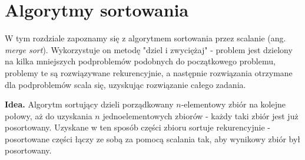 \section{Algorytmy sortowania}

W tym rozdziale zapoznamy się z algorytmem sortowania przez scalanie (ang. \textit{merge sort}). 
Wykorzystuje on metodę "dziel i zwyciężaj" - problem jest dzielony na kilka mniejszych podproblemów podobnych do początkowego problemu, problemy te są rozwiązywane rekurencyjnie, a następnie rozwiązania otrzymane dla podproblemów scala się, uzyskując rozwiązanie całego zadania.

\textbf{Idea.} Algorytm sortujący dzieli porządkowany $n$-elementowy zbiór na kolejne połowy, aż do uzyskania $n$ jednoelementowych zbiorów - każdy taki zbiór jest już posortowany. 
Uzyskane w ten sposób części zbioru sortuje rekurencyjnie - posortowane części łączy ze sobą za pomocą scalania tak, aby wynikowy zbiór był posortowany.

